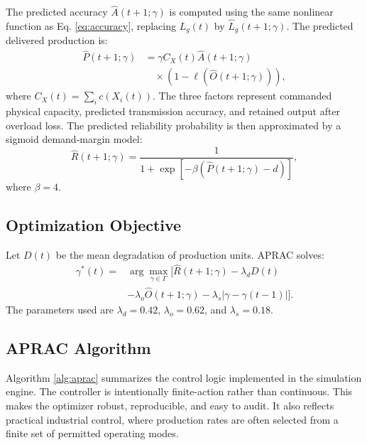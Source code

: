 \documentclass[journal]{IEEEtran}
\begin{document}
The predicted accuracy $\widehat{A}(t+1;\gamma)$ is computed using the same nonlinear function as Eq. \eqref{eq:accuracy}, replacing $L_g(t)$ by $\widehat{L}_g(t+1;\gamma)$. The predicted delivered production is:
\begin{equation}
\begin{aligned}
\widehat{P}(t+1;\gamma)
&=\gamma C_X(t)\widehat{A}(t+1;\gamma)\\
&\quad \times
\left(1-\ell(\widehat{O}(t+1;\gamma))\right),
\end{aligned}
\end{equation}
where $C_X(t)=\sum_i c(X_i(t))$. The three factors represent commanded physical capacity, predicted transmission accuracy, and retained output after overload loss. The predicted reliability probability is then approximated by a sigmoid demand-margin model:
\begin{equation}
\widehat{R}(t+1;\gamma)=
\frac{1}{1+\exp[-\beta(\widehat{P}(t+1;\gamma)-d)]},
\end{equation}
where $\beta=4$.

\subsection{Optimization Objective}

Let $D(t)$ be the mean degradation of production units. APRAC solves:
\begin{equation}
\begin{aligned}
\gamma^*(t)=
&\arg\max_{\gamma\in\Gamma}
\Big[
\widehat{R}(t+1;\gamma)-\lambda_dD(t)\\
&-\lambda_o\widehat{O}(t+1;\gamma)
-\lambda_s|\gamma-\gamma(t-1)|
\Big].
\end{aligned}
\label{eq:objective}
\end{equation}
The parameters used are $\lambda_d=0.42$, $\lambda_o=0.62$, and $\lambda_s=0.18$.

\subsection{APRAC Algorithm}

Algorithm \ref{alg:aprac} summarizes the control logic implemented in the simulation engine. The controller is intentionally finite-action rather than continuous. This makes the optimizer robust, reproducible, and easy to audit. It also reflects practical industrial control, where production rates are often selected from a finite set of permitted operating modes.
\end{document}
